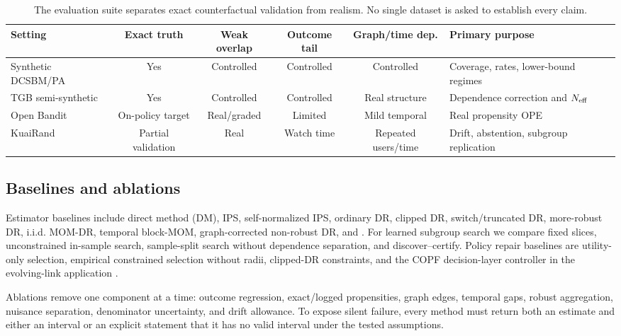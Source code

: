 \begin{table}[t]
\centering
\small
\setlength{\tabcolsep}{3.2pt}
\begin{tabularx}{\linewidth}{@{}lccccX@{}}
\toprule
Setting & Exact truth & Weak overlap & Outcome tail & Graph/time dep. & Primary purpose \\
\midrule
Synthetic DCSBM/PA & Yes & Controlled & Controlled & Controlled & Coverage, rates, lower-bound regimes \\
TGB semi-synthetic & Yes & Controlled & Controlled & Real structure & Dependence correction and $N_{\mathrm{eff}}$ \\
Open Bandit & On-policy target & Real/graded & Limited & Mild temporal & Real propensity OPE \\
KuaiRand & Partial validation & Real & Watch time & Repeated users/time & Drift, abstention, subgroup replication \\
\bottomrule
\end{tabularx}
\caption{The evaluation suite separates exact counterfactual validation from realism. No single dataset is asked to establish every claim.}
\label{tab:datasets}
\end{table}

\subsection{Baselines and ablations}
Estimator baselines include direct method (DM), IPS, self-normalized IPS, ordinary DR, clipped DR, switch/truncated DR, more-robust DR, i.i.d. MOM-DR, temporal block-MOM, graph-corrected non-robust DR, and \COMET. For learned subgroup search we compare fixed slices, unconstrained in-sample search, sample-split search without dependence separation, and discover--certify. Policy repair baselines are utility-only selection, empirical constrained selection without radii, clipped-DR constraints, and the COPF decision-layer controller in the evolving-link application \citep{li2026copf}.

Ablations remove one component at a time: outcome regression, exact/logged propensities, graph edges, temporal gaps, robust aggregation, nuisance separation, denominator uncertainty, and drift allowance. To expose silent failure, every method must return both an estimate and either an interval or an explicit statement that it has no valid interval under the tested assumptions.

